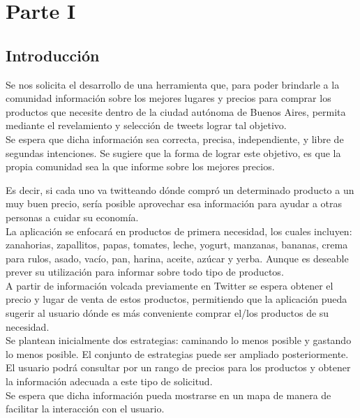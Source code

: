 \section{Parte I}
\subsection{Introducción}
Se nos solicita el desarrollo de una herramienta que, para poder brindarle a la comunidad información sobre los mejores lugares y precios para comprar los productos que necesite dentro de la ciudad autónoma de Buenos Aires, permita mediante el revelamiento y selección de tweets lograr tal objetivo. \\

Se espera que dicha información sea correcta, precisa, independiente, y libre de segundas intenciones. Se sugiere que la forma de lograr este objetivo, es que la propia comunidad sea la que informe sobre los mejores precios.

Es decir, si cada uno va twitteando dónde compró un determinado producto a un muy
buen precio, sería posible aprovechar esa información para ayudar a otras personas a cuidar su economía.\\

La aplicación se enfocará en productos de primera necesidad, los cuales incluyen: zanahorias, zapallitos, papas, tomates, leche, yogurt,
manzanas, bananas, crema para rulos, asado, vacío, pan, harina, aceite, azúcar y yerba. Aunque es deseable prever su utilización para informar sobre todo tipo de productos. \\

A partir de información volcada previamente en Twitter se espera obtener el precio y lugar de venta de estos productos, permitiendo que la aplicación pueda sugerir al usuario dónde es más conveniente comprar el/los productos de su necesidad.\\

Se plantean inicialmente dos estrategias: caminando lo menos posible y gastando lo menos posible. El conjunto de estrategias puede ser ampliado posteriormente.\\
El usuario podrá consultar por un rango de precios para los productos y obtener la información adecuada a este tipo de solicitud. \\

Se espera que dicha información pueda mostrarse en un mapa de manera de facilitar la interacción con el usuario.\\\\

